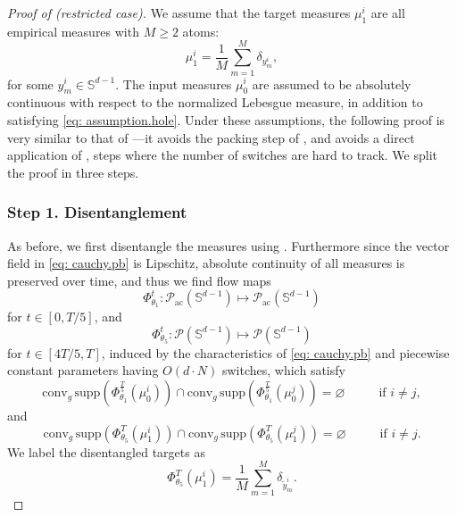\documentclass[a4paper,11pt]{article}
\theoremstyle{plain}
\newcommand{\supp}{\mathrm{supp}}
\newcommand{\conv}{\mathrm{conv}}
\renewcommand{\S}{\mathbb{S}^{d-1}}
\renewcommand{\geq}{\geqslant}
\numberwithin{equation}{section}
\begin{document}
\begin{proof}[Proof of  (restricted case)] \label{proof: proof.restricted}
We assume that the target measures $\mu_1^i$ are all empirical measures with $M \geq 2$ atoms:
\begin{equation*}
    \mu_1^i = \frac{1}{M}\sum_{m=1}^M \delta_{y_m^i},
\end{equation*}
for some $y_m^i \in \S$. The input measures $\mu_0^i$ are assumed to be absolutely continuous with respect to the normalized Lebesgue measure, in addition to satisfying \eqref{eq: assumption.hole}. Under these assumptions, the following proof
is very similar to that of ---it avoids the packing step of , and avoids a direct application of , steps where the number of switches are hard to track. We split the proof in three steps.

\subsubsection*{Step 1. Disentanglement}
As before, we first disentangle the measures using . Furthermore since the vector field in \eqref{eq: cauchy.pb} is Lipschitz, absolute continuity of all measures is preserved over time, and thus we find flow maps
\begin{equation*}
    \Phi_{\theta_1}^{t}:\mathscr{P}_{\mathrm{ac}}(\S)\mapsto \mathscr{P}_{\mathrm{ac}}(\S)
\end{equation*}
for $t\in[0,T/5]$, and
\begin{equation*}
    \Phi_{\theta_5}^{t}:\mathscr{P}(\S)\mapsto\mathscr{P}(\S)
\end{equation*}
for $t\in[4T/5, T]$, induced by the characteristics of \eqref{eq: cauchy.pb} and piecewise constant parameters having $O(d\cdot N)$ switches, which satisfy
\begin{equation*}
   \conv_g\,\supp\left(\Phi_{\theta_1}^{\frac{T}{5}}(\mu_0^i)\right)\cap \conv_g\,\supp\left(\Phi_{\theta_1}^{\frac{T}{5}}(\mu_0^j)\right)=\varnothing\hspace{1cm}\text{ if }i\neq j,
\end{equation*}
and 
\begin{equation*}
    \conv_g\,\supp\left(\Phi_{\theta_5}^{T}(\mu_1^i)\right)\cap \conv_g\,\supp\left(\Phi_{\theta_5}^{T}(\mu_1^j)\right)=\varnothing\hspace{1cm}\text{ if }i\neq j.
\end{equation*}
We label the disentangled targets as
\begin{equation} \label{eq: relabelling.target}
    \Phi_{\theta_5}^{T}(\mu_1^i)=\frac{1}{M}\sum_{m=1}^M\delta_{\widetilde{y}_m^i}.
\end{equation}


\end{proof}
\end{document}
